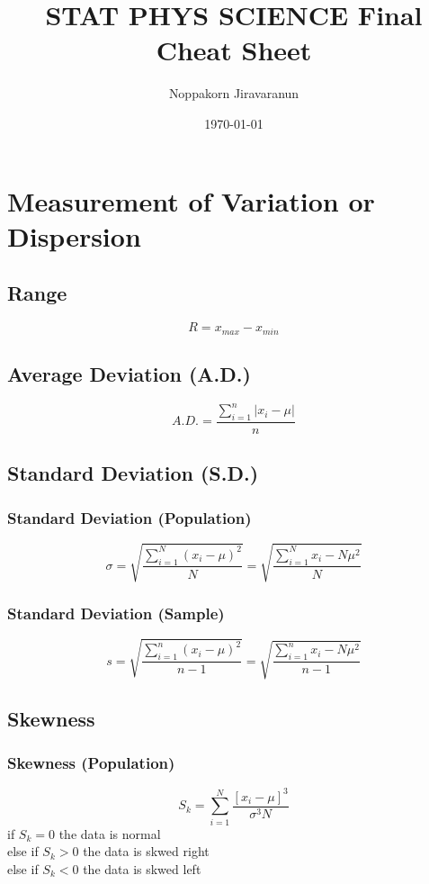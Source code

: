 \documentclass[twocolumn]{article}
\title{STAT PHYS SCIENCE Final Cheat Sheet}
\author{Noppakorn Jiravaranun}
\date{\today}
\begin{document}
\maketitle

\section{Measurement of Variation or Dispersion}
\subsection{Range}
\begin{equation}
    R = x_{max} - x_{min}
\end{equation}
\subsection{Average Deviation (A.D.)}
\begin{equation}
    A.D. = \frac{\sum_{i=1}^{n} |x_{i}-\mu|}{n}
\end{equation}
\subsection{Standard Deviation (S.D.)}
\subsubsection{Standard Deviation (Population)}
\begin{equation}
    \sigma = \sqrt{\frac{\sum_{i=1}^{N} (x_{i}-\mu)^2}{N}} = \sqrt{\frac{\sum_{i=1}^{N} x_{i} -N\mu^2}{N}}
\end{equation}
\subsubsection{Standard Deviation (Sample)}
\begin{equation}
    s = \sqrt{\frac{\sum_{i=1}^{n} (x_{i}-\mu)^2}{n-1}} = \sqrt{\frac{\sum_{i=1}^{n} x_{i} -N\mu^2}{n-1}}
\end{equation}

\subsection{Skewness}
\subsubsection{Skewness (Population)}
\begin{equation}
    S_{k} = \sum_{i=1}^{N}\frac{[x_{i} - \mu]^{3}}{\sigma^{3}N}
\end{equation}
if $S_{k} = 0$ the data is normal\\
else if $S_{k} > 0$ the data is skwed right\\
else if $S_{k} < 0$ the data is skwed left
\end{document}
